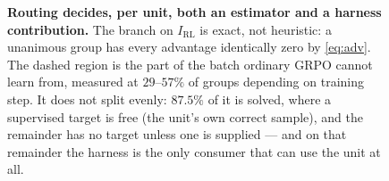 \begin{figure}[t]
\caption{%
  \textbf{Routing decides, per unit, both an estimator and a harness contribution.}
  The branch on $I_{\mathrm{RL}}$ is exact, not heuristic: a unanimous group has every
  advantage identically zero by \eqref{eq:adv}. The dashed region is the part of the batch
  ordinary GRPO cannot learn from, measured at $29$--$57\%$ of groups depending on training
  step. It does not split evenly: $87.5\%$ of it is solved, where a supervised target is
  free (the unit's own correct sample), and the remainder has no target unless one is
  supplied --- and on that remainder the harness is the only consumer that can use the unit
  at all.}
\label{fig:routing}
\end{figure}

